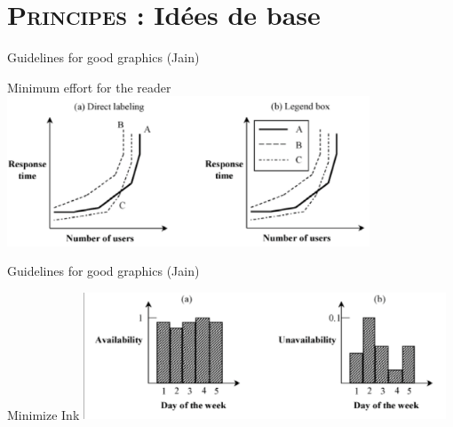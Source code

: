 \documentclass[xcolor=x11names,compress,8pt,fleqn]{beamer}
\renewcommand{\(}{\begin{columns}}
\renewcommand{\)}{\end{columns}}
\newcommand{\<}[1]{\begin{column}{#1}}
\renewcommand{\>}{\end{column}}
\begin{document}
 \section[{\scshape Guidelines}]{{\scshape Principes :} Idées de base}
\begin{frame}{Guidelines for good graphics (Jain)}
\begin{block}{Minimum effort for the reader}
\includegraphics[width=10.8cm]{Jain-graph1}
\end{block}
\end{frame}
\begin{frame}{Guidelines for good graphics (Jain)}
\begin{block}{Minimize Ink}
\includegraphics[width=10.8cm]{Jain-graph2}
\end{block}
\end{frame}
\end{document}
